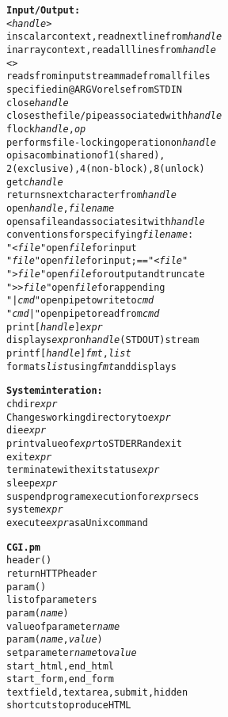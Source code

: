\documentclass[twocolumn,12pt]{article}
\begin{document}
\begin{alltt}
\textrm{\large\bf{Input/Output:}}
<\emph{handle}>
    \textrm{in scalar context, read next line from} \emph{handle}
    \textrm{in array context, read all lines from} \emph{handle}
<>
    \textrm{reads from input stream made from all files}
    \textrm{specified in} @ARGV \textrm{or else from} STDIN
close \emph{handle}
    \textrm{closes the file/pipe associated with} \emph{handle}
flock \emph{handle},\emph{op}
    \textrm{performs file-locking operation on} \emph{handle}
    op \textrm{is a combination of 1(shared),}
    \textrm{2(exclusive), 4(non-block), 8(unlock)}
getc \emph{handle}
    \textrm{returns next character from} \emph{handle}
open \emph{handle},\emph{filename}
    \textrm{opens a file and associates it with} \emph{handle}
    \textrm{conventions for specifying} \emph{filename}\textrm{:}
    "<\emph{file}"  \textrm{open \emph{file} for input}
    "\emph{file}"   \textrm{open \emph{file} for input;} == "<\emph{file}"
    ">\emph{file}"  \textrm{open \emph{file} for output and truncate}
    ">>\emph{file}" \textrm{open \emph{file} for appending}
    "|\emph{cmd}"   \textrm{open pipe to write to} \emph{cmd}
    "\emph{cmd}|"   \textrm{open pipe to read from} \emph{cmd}
print [\emph{handle}] \emph{expr}
    \textrm{displays} \emph{expr} \textrm{on} \emph{handle} \textrm{(}STDOUT\textrm{) stream}
printf [\emph{handle}] \emph{fmt},\emph{list}
    \textrm{formats} \emph{list} \textrm{using} \emph{fmt} \textrm{and displays}

\textrm{\large\bf{System interation:}}
chdir \emph{expr}
    \textrm{Changes working directory to \emph{expr}}
die \emph{expr}
    \textrm{print value of \emph{expr} to} STDERR \textrm{and exit}
exit \emph{expr}
    \textrm{terminate with exit status \emph{expr}}
sleep \emph{expr}
    \textrm{suspend program execution for \emph{expr} secs}
system \emph{expr}
    \textrm{execute \emph{expr} as a Unix command}

\textrm{\large\bf{CGI.pm}}
header()
    return HTTP header
param()
    list of parameters
param(\emph{name})
    value of parameter \emph{name}
param(\emph{name}, \emph{value})
    set parameter \emph{name} to \emph{value}
start_html, end_html
start_form, end_form
textfield, textarea, submit, hidden
    short cuts to produce HTML  
\end{alltt}
\end{document}
